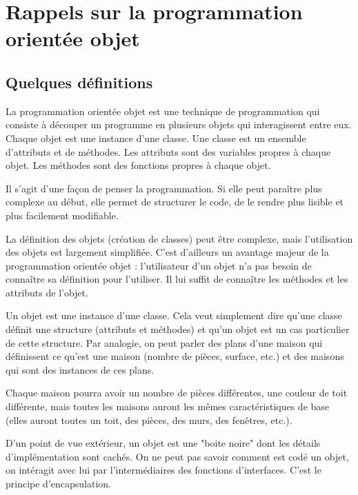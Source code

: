 \section{Rappels sur la programmation orientée objet}
\subsection{Quelques définitions}

La programmation orientée objet est une technique de programmation qui consiste à découper un programme en plusieurs objets qui interagissent entre eux. 
Chaque objet est une instance d'une classe. Une classe est un ensemble d'attributs et de méthodes. Les attributs sont des variables propres à chaque objet. Les méthodes sont des fonctions propres à chaque objet.

Il s'agit d'une façon de penser la programmation. Si elle peut paraître plus complexe au début, elle permet de structurer le code, de le rendre plus lisible et plus facilement modifiable. 

La définition des objets (création de classes) peut être complexe, mais l'utilisation des objets est largement simplifiée. C'est d'ailleurs un avantage majeur de la programmation orientée objet : l'utilisateur d'un objet n'a pas besoin de connaître sa définition pour l'utiliser. Il lui suffit de connaître les méthodes et les attributs de l'objet.


Un objet est une instance d'une classe. Cela veut simplement dire qu'une classe définit une structure (attributs et méthodes) et qu'un objet est un cas particulier de cette structure. Par analogie, on peut parler des plans d'une maison qui définissent ce qu'est une maison (nombre de pièces, surface, etc.) et des maisons qui sont des instances de ces plans. 

Chaque maison pourra avoir un nombre de pièces différentes, une couleur de toit différente, mais toutes les maisons auront les mêmes caractéristiques de base (elles auront toutes un toit, des pièces, des murs, des fenêtres, etc.).

\begin{center}
\end{center}


D'un point de vue extérieur, un objet est une "boite noire" dont les détails d'implémentation sont cachés. On ne peut pas savoir comment est codé un objet, on intéragit avec lui par l'intermédiaires des fonctions d'interfaces. C'est le principe d'encapsulation.

